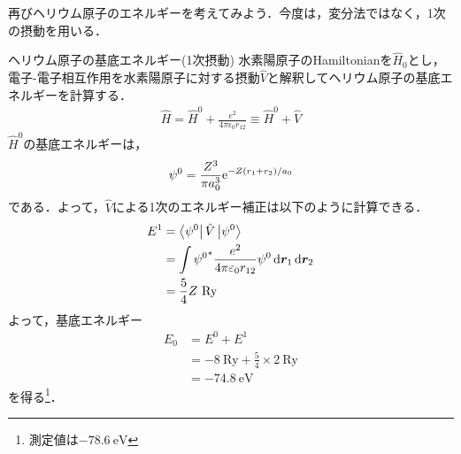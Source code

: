 \documentclass{report}
\begin{document}
  再びヘリウム原子のエネルギーを考えてみよう．今度は，変分法ではなく，1次の摂動を用いる．
  \begin{myex}{ヘリウム原子の基底エネルギー(1次摂動)}{}
    水素陽原子のHamiltonianを$\hat{H}_0$とし，電子-電子相互作用を水素陽原子に対する摂動$\hat{V}$と解釈してヘリウム原子の基底エネルギーを計算する．
    \begin{align}
      \hat{H} = \hat{H}^0 + \frac{e^2}{4\pi\epsilon_0r_{12}}\equiv\hat{H}^0 + \hat{V}
    \end{align}
    $\hat{H}^0$の基底エネルギーは，
    \begin{align}
      \psi^0 = \frac{Z^3}{\pi a_0^3}\mathrm{e}^{-Z(r_1+r_2)/a_0}
    \end{align}
    である．よって，$\hat{V}$による1次のエネルギー補正は以下のように計算できる．
    \begin{align}
      E^1 &= \bra{\psi^0}\hat{V}\ket{\psi^0}\\
      &= \int{\psi^0}^{*}\frac{e^2}{4\pi\varepsilon_0r_{12}}\psi^0\dd{\bm{r}_1}\dd{\bm{r}_2} \\
      &= \frac{5}{4}Z\ \mathrm{Ry}
    \end{align}
    よって，基底エネルギー
    \begin{align}
      E_0&=E^0+E^1\\
      &= -8\ \mathrm{Ry}+\frac{5}{4}\times{2}\ \mathrm{Ry}\\
      &= -74.8\ \mathrm{eV}
    \end{align}
    を得る\footnote{測定値は$-78.6\ \mathrm{eV}$}．
  \end{myex}
\end{document}
